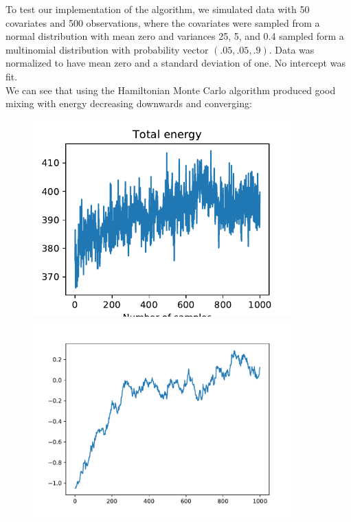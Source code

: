 To test our implementation of the algorithm, we simulated data with 50 covariates and 500 observations, where the covariates were sampled from a normal distribution with mean zero and variances 25, 5, and 0.4 sampled form a multinomial distribution with probability vector $(.05, .05, .9)$. Data was normalized to have mean zero and a standard deviation of one. No intercept was fit.\\

We can see that using the Hamiltonian Monte Carlo algorithm produced good mixing with energy decreasing downwards and converging:

\begin{figure}[H]
	\centering
	\begin{minipage}{0.45\textwidth}
		\centering
		\includegraphics[width=0.9\textwidth]{hmc-energy-sim.pdf} %
	\end{minipage}\hfill
	\begin{minipage}{0.45\textwidth}
		\centering
		\includegraphics[width=0.9\textwidth]{hmc-trace-pima.pdf} %
	\end{minipage}
\end{figure}

